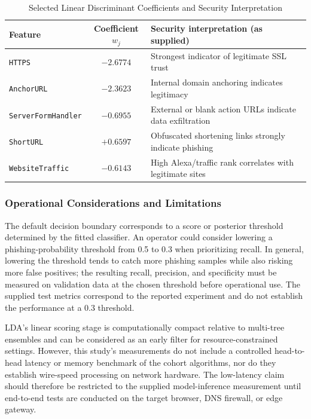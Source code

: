 \documentclass[conference]{IEEEtran}
\begin{document}
\begin{table}[!t]
\caption{Selected Linear Discriminant Coefficients and Security Interpretation}
\label{tab:lda-coefficients}
\centering
\footnotesize
\begin{tabular}{lcl}
\toprule
\textbf{Feature} & \textbf{Coefficient $w_j$} & \textbf{Security interpretation (as supplied)}\\
\midrule
\texttt{HTTPS} & $-2.6774$ & Strongest indicator of legitimate SSL trust\\
\texttt{AnchorURL} & $-2.3623$ & Internal domain anchoring indicates legitimacy\\
\texttt{ServerFormHandler} & $-0.6955$ & External or blank action URLs indicate data exfiltration\\
\texttt{ShortURL} & $+0.6597$ & Obfuscated shortening links strongly indicate phishing\\
\texttt{WebsiteTraffic} & $-0.6143$ & High Alexa/traffic rank correlates with legitimate sites\\
\bottomrule
\end{tabular}
\end{table}

\subsubsection{Operational Considerations and Limitations}
The default decision boundary corresponds to a score or posterior threshold determined by the fitted classifier. An operator could consider lowering a phishing-probability threshold from 0.5 to 0.3 when prioritizing recall. In general, lowering the threshold tends to catch more phishing samples while also risking more false positives; the resulting recall, precision, and specificity must be measured on validation data at the chosen threshold before operational use. The supplied test metrics correspond to the reported experiment and do not establish the performance at a 0.3 threshold.

LDA's linear scoring stage is computationally compact relative to multi-tree ensembles and can be considered as an early filter for resource-constrained settings. However, this study's measurements do not include a controlled head-to-head latency or memory benchmark of the cohort algorithms, nor do they establish wire-speed processing on network hardware. The low-latency claim should therefore be restricted to the supplied model-inference measurement until end-to-end tests are conducted on the target browser, DNS firewall, or edge gateway.
\end{document}
